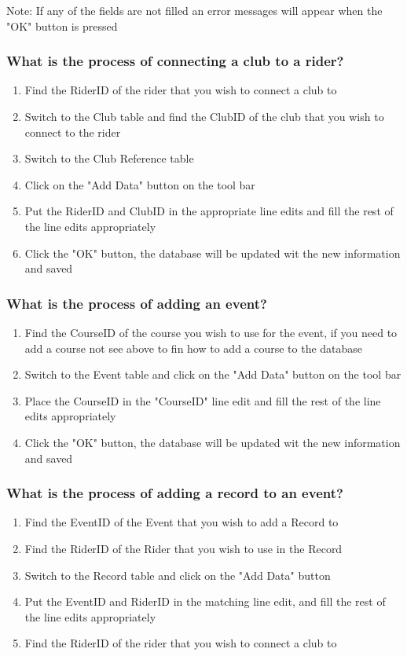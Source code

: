 Note: If  any of the fields are not filled an error messages will appear when the "OK" button is pressed

\subsubsection{What is the process of connecting a club to a rider?}
\begin{enumerate}
\item Find the RiderID of the rider that you wish to connect a club to
\item Switch to the Club table and find the ClubID of the club that you wish to connect to the rider
\item Switch to the Club Reference table
\item Click on the "Add Data" button on the tool bar
\item Put the RiderID and ClubID in the appropriate line edits and fill the rest of the line edits appropriately
\item Click the "OK" button, the database will be updated wit the new information and saved
\end{enumerate}
\subsubsection{What is the process of adding an event?}
\begin{enumerate}
\item Find the CourseID of the course you wish to use for the event, if you need to add a course not see above to fin how to add a course to the database
\item Switch to the Event table and click on the "Add Data" button on the tool bar
\item Place the CourseID in the "CourseID" line edit and fill the rest of the line edits appropriately
\item Click the "OK" button, the database will be updated wit the new information and saved
\end{enumerate}
\subsubsection{What is the process of adding a record to an event?}
\begin{enumerate}
\item Find the EventID of the Event that you wish to add a Record to
\item Find the RiderID of the Rider that you wish to use in the Record
\item Switch to the Record table and click on the "Add Data" button
\item Put the EventID and RiderID in the matching line edit, and fill the rest of the line edits appropriately
\item Find the RiderID of the rider that you wish to connect a club to
\end{enumerate}
